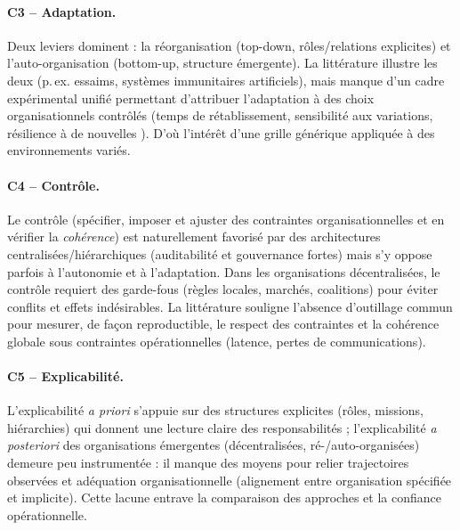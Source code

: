 \paragraph{C3 -- Adaptation.}
Deux leviers dominent : la réorganisation (top-down, rôles/relations explicites) et l'auto-organisation (bottom-up, structure émergente). La littérature illustre les deux (p.\,ex. essaims, systèmes immunitaires artificiels), mais manque d'un cadre expérimental unifié permettant d'attribuer l'adaptation à des choix organisationnels contrôlés (temps de rétablissement, sensibilité aux variations, résilience à de nouvelles ). D'où l'intérêt d'une grille générique appliquée à des environnements variés.

\paragraph{C4 -- Contrôle.}
Le contrôle (spécifier, imposer et ajuster des contraintes organisationnelles et en vérifier la \emph{cohérence}) est naturellement favorisé par des architectures centralisées/hiérarchiques (auditabilité et gouvernance fortes) mais s'y oppose parfois à l'autonomie et à l'adaptation. Dans les organisations décentralisées, le contrôle requiert des garde-fous (règles locales, marchés, coalitions) pour éviter conflits et effets indésirables. La littérature souligne l'absence d'outillage commun pour mesurer, de façon reproductible, le respect des contraintes et la cohérence globale sous contraintes opérationnelles (latence, pertes de communications).

\paragraph{C5 -- Explicabilité.}
L'explicabilité \emph{a priori} s'appuie sur des structures explicites (rôles, missions, hiérarchies) qui donnent une lecture claire des responsabilités ; l'explicabilité \emph{a posteriori} des organisations émergentes (décentralisées, ré-/auto-organisées) demeure peu instrumentée : il manque des moyens pour relier trajectoires observées et adéquation organisationnelle (alignement entre organisation spécifiée et implicite). Cette lacune entrave la comparaison des approches et la confiance opérationnelle.

